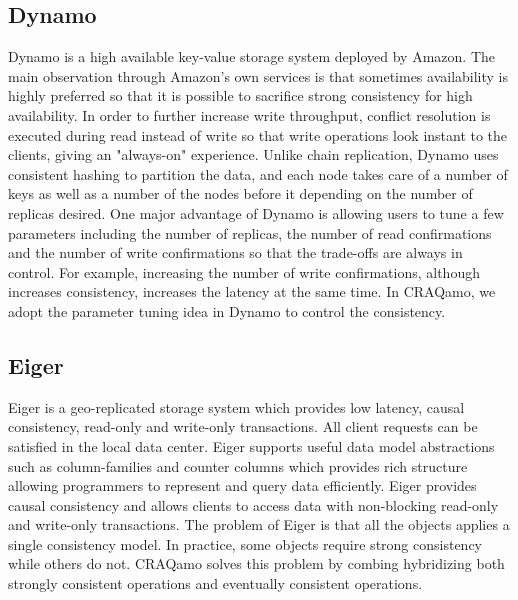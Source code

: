 \subsection{Dynamo}
Dynamo is a high available key-value storage system deployed by Amazon. The main observation through Amazon's own services is that sometimes availability is highly preferred so that it is possible to sacrifice strong consistency for high availability. In order to further increase write throughput, conflict resolution is executed during read instead of write so that write operations look instant to the clients, giving an "always-on" experience. Unlike chain replication, Dynamo uses consistent hashing to partition the data, and each node takes care of a number of keys as well as a number of the nodes before it depending on the number of replicas desired. One major advantage of Dynamo is allowing users to tune a few parameters including the number of replicas, the number of read confirmations and the number of write confirmations so that the trade-offs are always in control. For example, increasing the number of write confirmations, although increases consistency, increases the latency at the same time. In CRAQamo, we adopt the parameter tuning idea in Dynamo to control the consistency. 

\subsection{Eiger}
Eiger is a geo-replicated storage system which provides low latency, causal consistency, read-only and write-only transactions. All client requests can be satisfied in the local data center. Eiger supports useful data model abstractions such as column-families and counter columns which provides rich structure allowing programmers to represent and query data efficiently. Eiger provides causal consistency and allows clients to access data with non-blocking read-only and write-only transactions. The problem of Eiger is that all the objects applies a single consistency model. In practice, some objects require strong consistency while others do not. CRAQamo solves this problem by combing hybridizing both strongly consistent operations and eventually consistent operations. 

\label{sec:related}

